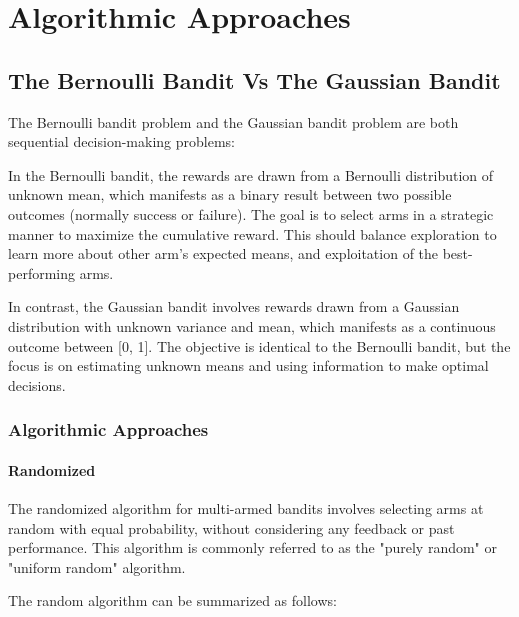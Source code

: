 \chapter{Algorithmic Approaches}
\label{cha:algorithmic} %

\section{The Bernoulli Bandit Vs The Gaussian Bandit}
\label{sec:BernoulliBandit}

The Bernoulli bandit problem and the Gaussian bandit problem are both sequential decision-making problems:

In the Bernoulli bandit, the rewards are drawn from a Bernoulli distribution of unknown mean, which manifests as a binary result between two possible outcomes (normally success or failure). The goal is to select arms in a strategic manner to maximize the cumulative reward. This should balance exploration to learn more about other arm's expected means, and exploitation of the best-performing arms.

In contrast, the Gaussian bandit involves rewards drawn from a Gaussian distribution with unknown variance and mean, which manifests as a continuous outcome between [0, 1]. The objective is identical to the Bernoulli bandit, but the focus is on estimating unknown means and using information to make optimal decisions.

\subsection{Algorithmic Approaches}
\label{sec:Algorithms}

\subsubsection{Randomized}
\label{sec:randomized}
The randomized algorithm for multi-armed bandits involves selecting arms at random with equal probability, without considering any feedback or past performance. This algorithm is commonly referred to as the "purely random" or "uniform random" algorithm.

The random algorithm can be summarized as follows:


